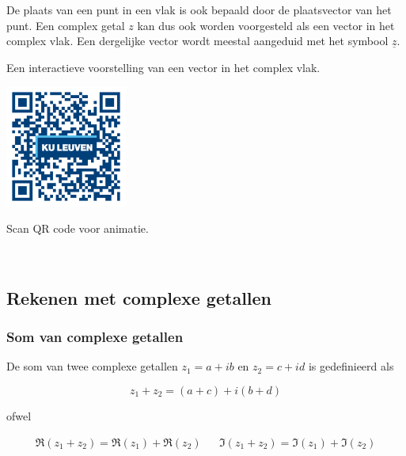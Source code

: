 De plaats van een punt in een vlak is ook bepaald door de plaatsvector van het punt. Een complex getal $z$ kan dus ook worden voorgesteld als een vector in het complex vlak. Een dergelijke vector wordt meestal aangeduid met het symbool $\underline{z}$.\\


Een interactieve voorstelling van een vector in het complex vlak.\\

\begin{minipage}{.25\linewidth}
	\raggedright
	\includegraphics[width=4cm]{3_gonio_complexe_getallen/inputs/QR_Code_ANIMATIE2_module3new}
\end{minipage}
\begin{minipage}{.7\linewidth}
	Scan QR code voor animatie.
\end{minipage}  \\

\subsection{Rekenen met complexe getallen}

\subsubsection{Som van complexe getallen}

\begin{definitie}
De som van twee complexe getallen $z_{1}=a+ib$ en $z_{2}=c+id$ is gedefinieerd als\\

\begin{framed}
\[ z_{1}+z_{2}=(a+c)+i(b+d) \]
\end{framed}

ofwel

\begin{framed}
\[	
\begin{array}{ccc}
\Re(z_{1}+z_{2})=\Re(z_{1})+\Re(z_{2}) &  & \Im(z_{1}+z_{2})=\Im(z_{1})+\Im(z_{2}) 
\end{array} 
\]
\end{framed}
\end{definitie}


